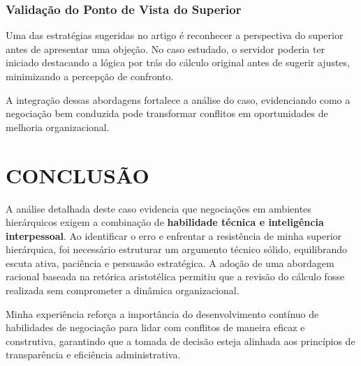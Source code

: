 \documentclass[article,12pt,oneside,a4paper]{article}
\begin{document}
\subsubsection{Validação do Ponto de Vista do Superior}
\label{sec:orga845694}

Uma das estratégias sugeridas no artigo é reconhecer a perspectiva do superior antes de apresentar uma objeção. No caso estudado, o servidor poderia ter iniciado destacando a lógica por trás do cálculo original antes de sugerir ajustes, minimizando a percepção de confronto.

A integração dessas abordagens fortalece a análise do caso, evidenciando como a negociação bem conduzida pode transformar conflitos em oportunidades de melhoria organizacional.
\section{CONCLUSÃO}
\label{sec:orgf5d5404}
A análise detalhada deste caso evidencia que negociações em ambientes hierárquicos exigem a combinação de \textbf{habilidade técnica e inteligência interpessoal}. Ao identificar o erro e enfrentar a resistência de minha superior hierárquica, foi necessário estruturar um argumento técnico sólido, equilibrando escuta ativa, paciência e persuasão estratégica. A adoção de uma abordagem racional baseada na retórica aristotélica permitiu que a revisão do cálculo fosse realizada sem comprometer a dinâmica organizacional.

Minha experiência reforça a importância do desenvolvimento contínuo de habilidades de negociação para lidar com conflitos de maneira eficaz e construtiva, garantindo que a tomada de decisão esteja alinhada aos princípios de transparência e eficiência administrativa.
\renewcommand{\bibname}{REFERÊNCIAS}

\end{document}
